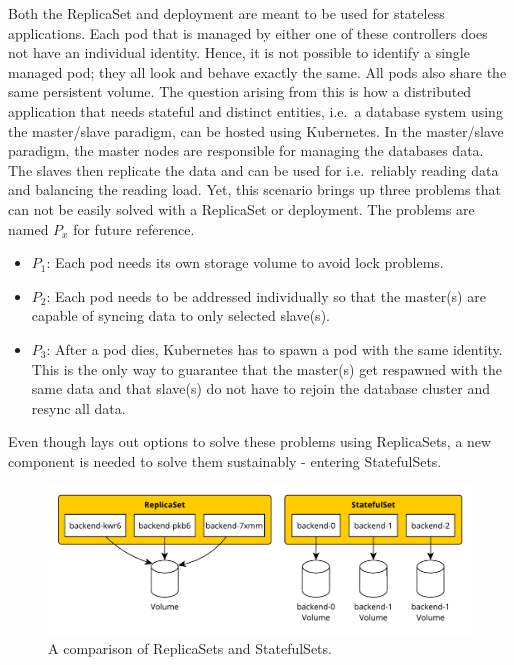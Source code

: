 
Both the ReplicaSet and deployment are meant to be used for stateless
applications. Each pod that is managed by either one of these controllers does
not have an individual identity. Hence, it is not possible to identify a single
managed pod; they all look and behave exactly the same. All pods also share the
same persistent volume. The question arising from this is how a distributed
application that needs stateful and distinct entities, i.e.\ a database system
using the master/slave paradigm, can be hosted using Kubernetes. In the
master/slave paradigm, the master nodes are responsible for managing the
databases data. The slaves then replicate the data and can be used for i.e.\
reliably reading data and balancing the reading load. Yet, this scenario brings
up three problems that can not be easily solved with a ReplicaSet or
deployment. The problems are named $P_x$ for future reference.

\begin{itemize}
  \item \textbf{$P_1$}: Each pod needs its own storage volume to avoid lock problems.
  \item \textbf{$P_2$}: Each pod needs to be addressed individually so that the master(s) are
    capable of syncing data to only selected slave(s).
  \item \textbf{$P_3$}: After a pod dies, Kubernetes has to spawn a pod with
    the same identity. This is the only way to guarantee that the master(s)
    get respawned with the same data and that slave(s) do not have to rejoin
    the database cluster and resync all data.
\end{itemize}

Even though \autocite[Ch. 10]{LuksaKubernetesAction2017} lays out options to
solve these problems using ReplicaSets, a new component is needed to solve them
sustainably - entering StatefulSets. 

\begin{figure}[H]
  \begin{center}
  \includegraphics[scale=0.65]{images/figures/statefulSets_vs_replicaSets.pdf}
\end{center}
\caption{A comparison of ReplicaSets and StatefulSets.}%
\label{fig:statefulSetsVSReplicaSets}
\end{figure}

